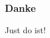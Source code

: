\documentclass[table]{beamer}
\begin{document}
    
    \begin{frame}
        \frametitle{Danke}

        \begin{center}
            Just do ist!
        \end{center}
    
    \end{frame}    
    
    
\end{document}
